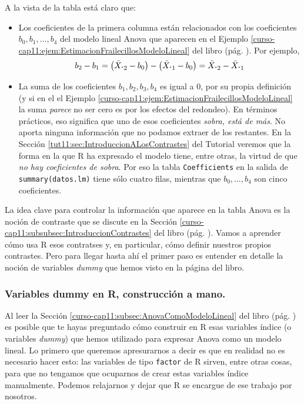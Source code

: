 \documentclass[10pt,a4paper]{article}\usepackage[]{graphicx}\usepackage[]{color}
\newcounter {cont01}
\begin{document}
A la vista de la tabla está claro que:
\begin{itemize}
  \item Los coeficientes de la primera columna están relacionados con los coeficientes $b_0, b_1,\ldots, b_4$ del modelo lineal Anova que aparecen en el Ejemplo \ref{curso-cap11:ejem:EstimacionFrailecillosModeloLineal} del libro (pág. \pageref{curso-cap11:ejem:EstimacionFrailecillosModeloLineal}). Por ejemplo,
  $$b_2 - b_1 = \left(\bar X_{{\mbox{\bf\large$\cdot$}}2}-b_0\right) - \left(\bar X_{{\mbox{\bf\large$\cdot$}}1}- b_0\right) = \bar X_{{\mbox{\bf\large$\cdot$}}2} - \bar X_{{\mbox{\bf\large$\cdot$}}1}$$
  \item La suma de los coeficientes $b_1, b_2, b_3, b_4$ es igual a $0$, por su propia definición (y si en el el Ejemplo \ref{curso-cap11:ejem:EstimacionFrailecillosModeloLineal} la suma {\em parece} no ser cero es por los efectos del redondeo). En términos prácticos, eso significa que uno de esos coeficientes {\em sobra, está de más}. No aporta ninguna información que no podamos extraer de los restantes. En la Sección \ref{tut11:sec:IntroduccionALosContrastes} del Tutorial veremos que la forma en la que R ha expresado el modelo tiene, entre otras, la virtud de que {\em no hay coeficientes de sobra}. Por eso la tabla {\tt Coefficients} en la salida de {\tt summary(datos.lm)} tiene sólo cuatro filas, mientras que $b_0, \ldots, b_4$ son cinco coeficientes.
\end{itemize}

La idea clave para controlar la información que aparece en la tabla Anova es la noción de contraste que se discute en la Sección \ref{curso-cap11:subsubsec:IntroduccionContrastes} del libro (pág. \pageref{curso-cap11:subsubsec:IntroduccionContrastes}). Vamos a aprender cómo usa R esos contratses y, en particular, cómo definir nuestros propios contrastes. Pero para llegar hasta ahí el primer paso es entender en detalle la noción de variables {\em dummy} que hemos visto en la página \pageref{curso-cap11:subsubsec:VariablesDummy} del libro.

\subsubsection*{Variables dummy en R, construcción a mano.}
\label{tut11:subsubsec:VariablesDummyEnRaMano}


Al leer la Sección \ref{curso-cap11:subsec:AnovaComoModeloLineal} del libro (pág. \pageref{curso-cap11:subsec:AnovaComoModeloLineal}) es posible que te hayas preguntado cómo construir en R esas variables índice (o variables {\em dummy}) que hemos utilizado para expresar Anova como un modelo lineal. Lo primero que queremos apresurarnos a decir es que en realidad no es necesario hacer esto: las variables de tipo {\tt factor} de R sirven, entre otras cosas, para que no tengamos que ocuparnos de crear estas variables índice manualmente. Podemos relajarnos y dejar que R se encargue de ese trabajo por nosotros.
\end{document}
